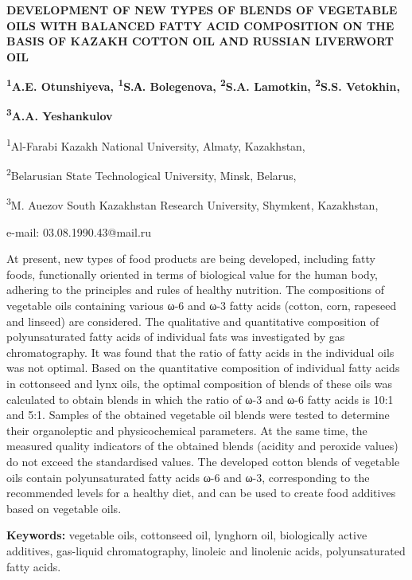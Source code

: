 \begin{center}
{\large\bfseries DEVELOPMENT OF NEW TYPES OF BLENDS OF VEGETABLE OILS WITH
BALANCED FATTY ACID COMPOSITION ON THE BASIS OF KAZAKH COTTON OIL AND
RUSSIAN LIVERWORT OIL}

{\bfseries \textsuperscript{1}A.E. Otunshiyeva, \textsuperscript{1}S.А.
Bolegenova, \textsuperscript{2}S.A. Lamotkin, \textsuperscript{2}S.S.
Vetokhin,}

{\bfseries \textsuperscript{3}A.A. Yeshankulov}

\textsuperscript{1}Al-Farabi Kazakh National University, Almaty,
Kazakhstan,

\textsuperscript{2}Belarusian State Technological University, Minsk,
Belarus,

\textsuperscript{3}M. Auezov South Kazakhstan Research University,
Shymkent, Kazakhstan,

e-mail: 03.08.1990.43@mail.ru
\end{center}

At present, new types of food products are being developed, including
fatty foods, functionally oriented in terms of biological value for the
human body, adhering to the principles and rules of healthy nutrition.
The compositions of vegetable oils containing various ω-6 and ω-3 fatty
acids (cotton, corn, rapeseed and linseed) are considered. The
qualitative and quantitative composition of polyunsaturated fatty acids
of individual fats was investigated by gas chromatography. It was found
that the ratio of fatty acids in the individual oils was not optimal.
Based on the quantitative composition of individual fatty acids in
cottonseed and lynx oils, the optimal composition of blends of these
oils was calculated to obtain blends in which the ratio of ω-3 and ω-6
fatty acids is 10:1 and 5:1. Samples of the obtained vegetable oil
blends were tested to determine their organoleptic and physicochemical
parameters. At the same time, the measured quality indicators of the
obtained blends (acidity and peroxide values) do not exceed the
standardised values. The developed cotton blends of vegetable oils
contain polyunsaturated fatty acids ω-6 and ω-3, corresponding to the
recommended levels for a healthy diet, and can be used to create food
additives based on vegetable oils.

{\bfseries Keywords:} vegetable oils, cottonseed oil, lynghorn oil,
biologically active additives, gas-liquid chromatography, linoleic and
linolenic acids, polyunsaturated fatty acids.

